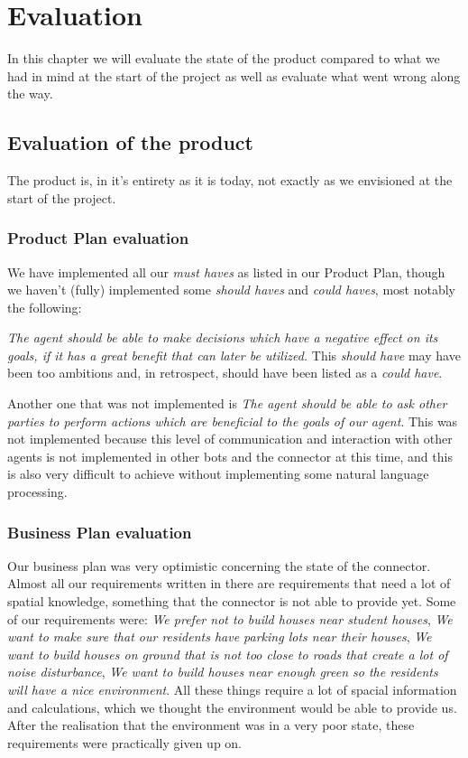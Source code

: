 \chapter{Evaluation}
In this chapter we will evaluate the state of the product compared to what we had in mind at the start of the project as well as evaluate what went wrong along the way.

\section{Evaluation of the product}
The product is, in it's entirety as it is today, not exactly as we envisioned at the start of the project.

\subsection{Product Plan evaluation} We have implemented all our \emph{must haves} as listed in our Product Plan, though we haven't (fully) implemented some \emph{should haves} and \emph{could haves}, most notably the following:

\emph{The agent should be able to make decisions which have a negative effect on its goals, if it has a great benefit that can later be utilized.} This \emph{should have} may have been too ambitions and, in retrospect, should have been listed as a \emph{could have}.

Another one that was not implemented is \emph{The agent should be able to ask other parties to perform actions which are beneficial to the goals of our agent}. This was not implemented because this level of communication and interaction with other agents is not implemented in other bots and the connector at this time, and this is also very difficult to achieve without implementing some natural language processing.

\subsection{Business Plan evaluation} Our business plan was very optimistic concerning the state of the connector. Almost all our requirements written in there are requirements that need a lot of spatial knowledge, something that the connector is not able to provide yet. Some of our requirements were: \emph{We prefer not to build houses near student houses}, \emph{We want to make sure that our residents have parking lots near their houses}, \emph{We want to build houses on ground that is not too close to roads that create a lot of noise disturbance}, \emph{We want to build houses near enough green so the residents will have a nice environment}. All these things require a lot of spacial information and calculations, which we thought the environment would be able to provide us. After the realisation that the environment was in a very poor state, these requirements were practically given up on.

